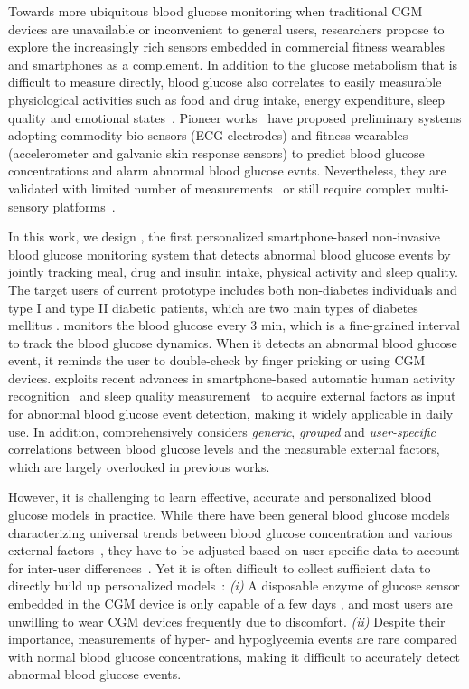 Towards more ubiquitous blood glucose monitoring when traditional CGM devices are unavailable or inconvenient to general users, researchers propose to explore the increasingly rich sensors embedded in commercial fitness wearables and smartphones as a complement.
In addition to the glucose metabolism that is difficult to measure directly, blood glucose also correlates to easily measurable physiological activities such as food and drug intake, energy expenditure, sleep quality and emotional states~\cite{bib:DRCP15:Iwasaki}.
Pioneer works~\cite{bib:EMBC12:Nguyen, bib:SEMPER16:Ranvier, bib:JDST14:Sobel} have proposed preliminary systems adopting commodity bio-sensors (\eg ECG electrodes) and fitness wearables (\eg accelerometer and galvanic skin response sensors) to predict blood glucose concentrations and alarm abnormal blood glucose evnts.
Nevertheless, they are validated with limited number of measurements~\cite{bib:SEMPER16:Ranvier, bib:JDST14:Sobel} or still require complex multi-sensory platforms~\cite{bib:EMBC12:Nguyen, bib:JDST14:Sobel}.

In this work, we design \sysname, the first personalized smartphone-based non-invasive blood glucose monitoring system that detects abnormal blood glucose events by jointly tracking meal, drug and insulin intake, physical activity and sleep quality. \textcolor[rgb]{1.00,0.00,0.00}{The target users of current prototype includes both non-diabetes individuals and type I and type II diabetic patients, which are two main types of diabetes mellitus \cite{bib:Diabetes_mellitus}. \sysname monitors the blood glucose every 3 min, which is a fine-grained interval to track the blood glucose dynamics. When it detects an abnormal blood glucose event, it reminds the user to double-check by finger pricking or using CGM devices}.
\sysname exploits recent advances in smartphone-based automatic human activity recognition~\cite{bib:KDDEN11:Kwapisz} and sleep quality measurement~\cite{bib:UbiComp14:Gu} to acquire external factors as input for abnormal blood glucose event detection, making it widely applicable in daily use.
In addition, \sysname comprehensively considers \emph{generic}, \emph{grouped}  and \emph{user-specific} correlations between blood glucose levels and the measurable external factors, which are largely overlooked in previous works.

However, it is challenging to learn effective, accurate and personalized blood glucose models in practice.
While there have been general blood glucose models characterizing universal trends between blood glucose concentration and various external factors~\cite{bib:IJNMBE16:Oviedo}, they have to be adjusted based on user-specific data to account for inter-user differences~\cite{bib:ICMLA13:Bunescu}.
Yet it is often difficult to collect sufficient data to directly build up personalized models~\cite{bib:KDHealth16:Marling}:
\emph{(i)}
A disposable enzyme of glucose sensor embedded in the CGM device is only capable of a few days \cite{bib:CGM_wiki, bib:CGM_wave}, and most users are unwilling to wear CGM devices frequently due to discomfort.
\emph{(ii)}
Despite their importance, measurements of hyper- and hypoglycemia events are rare compared with normal blood glucose concentrations, making it difficult to accurately detect abnormal blood glucose events.

